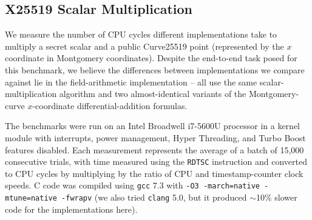 \documentclass[conference,letterpaper]{IEEEtran}
\begin{document}
\subsection{X25519 Scalar Multiplication}

We measure the number of CPU cycles different implementations take to multiply a secret scalar and a public Curve25519 point (represented by the $x$ coordinate in Montgomery coordinates).
Despite the end-to-end task posed for this benchmark, we believe the differences between implementations we compare against lie in the field-arithmetic implementation --
all use the same scalar-multiplication algorithm and two almost-identical variants of the Montgomery-curve $x$-coordinate differential-addition formulas.

The benchmarks were run on an Intel Broadwell i7-5600U processor in a kernel module
with interrupts, power management, Hyper Threading, and Turbo Boost features disabled.
Each measurement represents the average of a batch of 15,000 consecutive trials, with time measured using the \texttt{RDTSC} instruction and converted to CPU cycles by multiplying by the ratio of CPU and timestamp-counter clock speeds.
C code was compiled using \texttt{gcc} 7.3 with \texttt{-O3 -march=native -mtune=native -fwrapv} (we also tried \texttt{clang} 5.0, but it produced $\sim$10\% slower code for the implementations here).
\end{document}
